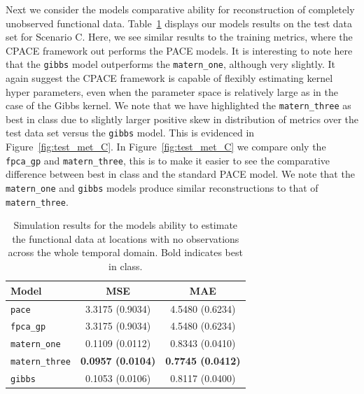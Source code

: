 Next we consider the models comparative ability for reconstruction of completely unobserved functional data.
Table~\ref{tab:test_C} displays our models results on the test data set for Scenario C.
Here, we see similar results to the training metrics, where the CPACE framework out performs the PACE models.
It is interesting to note here that the \verb*|gibbs| model outperforms the \verb*|matern_one|, although very slightly.
It again suggest the CPACE framework is capable of flexibly estimating kernel hyper parameters, even when the parameter space is relatively large as in the case of the Gibbs kernel.
We note that we have highlighted the \verb*|matern_three| as best in class due to slightly larger positive skew in distribution of metrics over the test data set versus the \verb*|gibbs| model. 
This is evidenced in Figure~\ref{fig:test_met_C}.
In Figure~\ref{fig:test_met_C} we compare only the \verb*|fpca_gp| and \verb*|matern_three|, this is to make it easier to see the comparative difference between best in class and the standard PACE model.
We note that the \verb*|matern_one| and \verb*|gibbs| models produce similar reconstructions to that of \verb*|matern_three|.

\begin{table}
	\caption[Simulation results for Scenario C on test data.]{Simulation results for the models ability to estimate the functional data at locations with no observations across the whole temporal domain. Bold indicates best in class.}
	\centering
	\label{tab:test_C}
	\begin{tabular}{lcc}
		\toprule
		\textbf{Model} & \textbf{MSE} & \textbf{MAE} \\
		\midrule
		\verb*|pace| & 3.3175 (0.9034) & 4.5480	(0.6234) \\
		\verb*|fpca_gp| & 3.3175 (0.9034) & 4.5480	(0.6234)  \\
		\verb*|matern_one| & 0.1109	(0.0112) & 0.8343 (0.0410) \\
		\verb*|matern_three| & \textbf{0.0957 (0.0104)} & \textbf{0.7745 (0.0412)} \\
		\verb*|gibbs| & 0.1053 (0.0106) & 0.8117 (0.0400)\\
		\bottomrule
	\end{tabular}
\end{table}

